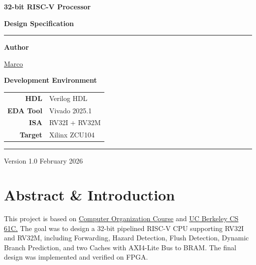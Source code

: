 \documentclass[12pt,a4paper]{report}
\begin{document}
\pagestyle{plain}

\setlength{}
\setlength{}

\begin{titlepage}
\centering
\vspace*{3cm}

{\fontsize{28}{34}\selectfont\bfseries 32-bit RISC-V Processor\par}
\vspace{0.6em}
{\fontsize{16}{20}\selectfont\bfseries Design Specification\par}

\vspace{1.5cm}
\textcolor{coffee}{\rule{0.6\linewidth}{1.2pt}}
\vspace{1.5cm}

{\large\bfseries Author}\par
\vspace{0.4em}
{\large \href{https://github.com/akira2963753}{Marco}}\par

\vspace{2cm}

{\large\bfseries Development Environment}\par
\vspace{0.8em}
\begin{tabular}{rl}
    \textbf{HDL}     & Verilog HDL \\[4pt]
    \textbf{EDA Tool}  & Vivado 2025.1 \\[4pt]
    \textbf{ISA}       & RV32I + RV32M \\[4pt]
    \textbf{Target}    & Xilinx ZCU104 \\
\end{tabular}

\vfill

\textcolor{coffee}{\rule{0.6\linewidth}{0.6pt}}\par
\vspace{0.5em}
{\small Version 1.0 \quad\textbullet\quad February 2026}

\end{titlepage}

\tableofcontents
\newpage

\chapter{Abstract \& Introduction}

This project is based on \href{https://github.com/akira2963753/Pipelined-RV32-SoC/tree/main?tab=readme-ov-file}{Computer Organization Course} and \href{https://cs61c.org/}{UC Berkeley CS 61C.} The goal was to design a 32-bit pipelined RISC-V CPU supporting RV32I and RV32M, including Forwarding, Hazard Detection, Flush Detection, Dynamic Branch Prediction, and two Caches with AXI4-Lite Bus to BRAM. The final design was implemented and verified on FPGA.
\end{document}

